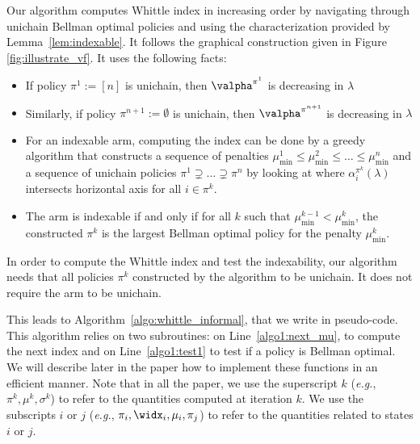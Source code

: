 Our algorithm computes Whittle index in increasing order by navigating through unichain Bellman optimal policies and using the characterization provided by Lemma~\ref{lem:indexable}. It follows the graphical construction given in Figure \ref{fig:illustrate_vf}. It uses the following facts:
\begin{itemize}
    \item If policy $\pi^1:=[n]$ is unichain, then $\valpha^{\pi^1}$ is decreasing in $\lambda$
    \item Similarly, if policy $\pi^{n+1}:=\emptyset$ is unichain, then $\valpha^{\pi^{n+1}}$ is decreasing in $\lambda$
    \item For an indexable arm, computing the index can be done by a greedy algorithm that constructs a sequence of penalties $\mu^1_{\min}\le\mu^2_{\min}\le\dots\le\mu^n_{\min}$ and a sequence of unichain policies $\pi^1\supsetneq\dots\supsetneq\pi^{n}$ by looking at where $\alpha^{\pi^k}_i(\lambda)$ intersects horizontal axis for all $i\in\pi^k$.
    \item The arm is indexable if and only if for all $k$ such that $\mu^{k-1}_{\min}<\mu^{k}_{\min}$, the constructed $\pi^k$ is the largest Bellman optimal policy for the penalty $\mu^k_{\min}$.
\end{itemize}
In order to compute the Whittle index and test the indexability, our algorithm needs that all policies $\pi^k$ constructed by the algorithm to be unichain. It does not require the arm to be unichain. 

This leads to Algorithm~\ref{algo:whittle_informal}, that we write in pseudo-code. %
This algorithm relies on two subroutines: on Line~\ref{algo1:next_mu}, to compute the next index and on Line~\ref{algo1:test1} to test if a policy is Bellman optimal. We will describe later in the paper how to implement these functions in an efficient manner.  Note that in all the paper, we use the superscript $k$ (\emph{e.g.}, $\pi^k, \mu^k, \sigma^k$) to refer to the quantities computed at iteration $k$. We use the subscripts $i$ or $j$ (\emph{e.g.}, $\pi_i, \widx_i, \mu_i, \pi_j$) to refer to the quantities related to states $i$ or $j$.

